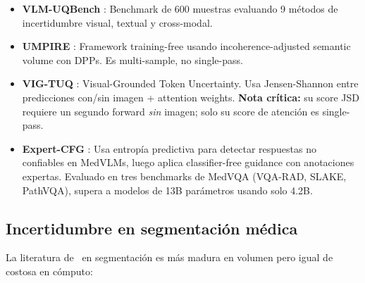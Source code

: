\documentclass[12pt,a4paper]{article}
\newcommand{\UQ}{\text{UQ}}
\begin{document}
\begin{itemize}[leftmargin=2em]
    \item \textbf{VLM-UQBench} \citep{vlmuqbench2026}: Benchmark de 600 muestras evaluando 9 métodos de incertidumbre visual, textual y cross-modal.

    \item \textbf{UMPIRE} \citep{umpire2026}: Framework training-free usando incoherence-adjusted semantic volume con DPPs.
    Es multi-sample, no single-pass.

    \item \textbf{VIG-TUQ} \citep{vigtuq2026}: Visual-Grounded Token Uncertainty.
    Usa Jensen-Shannon entre predicciones con/sin imagen + attention weights.
    \textbf{Nota crítica:} su score JSD requiere un segundo forward \textit{sin} imagen; solo su score de atención es single-pass.

    \item \textbf{Expert-CFG} \citep{liang2025uncertainty}: Usa entropía predictiva para detectar respuestas no confiables en MedVLMs, luego aplica classifier-free guidance con anotaciones expertas.
    Evaluado en tres benchmarks de MedVQA (VQA-RAD, SLAKE, PathVQA), supera a modelos de 13B parámetros usando solo 4.2B.
\end{itemize}

\subsection{Incertidumbre en segmentación médica}
\label{sec:lit-seg}

La literatura de \UQ\ en segmentación es más madura en volumen pero igual de costosa en cómputo:
\end{document}
